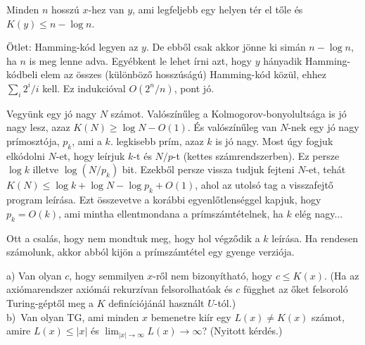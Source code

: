 \begin{Exercise}[counter={sorszam}, difficulty=0]
	Minden $n$ hosszú $x$-hez van $y$, ami legfeljebb egy helyen tér el t\H ole és $K(y)\leq n - \log n$.
\end{Exercise}	
\begin{Answer}
	\"Otlet: Hamming-k\'od legyen az $y$. De ebb\H ol csak akkor j\"onne ki sim\'an $n-\log n$, ha $n$ is meg lenne adva. Egy\'ebkent le lehet \'irni azt, hogy $y$ h\'anyadik Hamming-k\'odbeli elem az \"osszes (k\"ul\"onb\"oz\H o hossz\'us\'ag\'u) Hamming-k\'od k\"oz\"ul, ehhez $\sum_i 2^i/i$ kell. Ez indukci\'oval $O(2^n/n)$, pont j\'o.
\end{Answer}


\begin{Exercise}[counter={sorszam}, difficulty=0]
	Vegy\"unk egy j\'o nagy $N$ sz\'amot. Val\'osz\'in\H uleg a Kolmogorov-bonyolults\'aga is j\'o nagy lesz, azaz $K(N)\ge \log N - O(1)$. \'Es val\'osz\'in\H uleg van $N$-nek egy j\'o nagy pr\'imoszt\'oja, $p_k$, ami a $k.$ legkisebb pr\'im, azaz $k$ is j\'o nagy. Most \'ugy fogjuk elk\'odolni $N$-et, hogy le\'irjuk $k$-t \'es $N/p$-t (kettes sz\'amrendszerben). Ez persze $\log k$ illetve $\log (N/p_k)$ bit. Ezekb\H ol persze vissza tudjuk fejteni $N$-et, teh\'at $K(N)\le \log k + \log N - \log p_k +O(1)$, ahol az utols\'o tag a visszafejt\H o program le\'ir\'asa. Ezt \"osszevetve a kor\'abbi egyenl\H otlens\'eggel kapjuk, hogy $p_k=O(k)$, ami mintha ellentmondana a pr\'imsz\'amt\'etelnek, ha $k$ el\'eg nagy...
\end{Exercise}	
\begin{Answer}
	Ott a csal\'as, hogy nem mondtuk meg, hogy hol v\'egz\H odik a $k$ le\'ir\'asa. Ha rendesen sz\'amolunk, akkor abb\'ol kij\"on a pr\'imsz\'amt\'etel egy gyenge verzi\'oja.
\end{Answer}

\begin{Exercise}[counter={sorszam}, difficulty=0]
	a) Van olyan $c$, hogy semmilyen $x$-r\H ol nem bizony\'ithat\'o, hogy $c\le K(x)$. (Ha az axi\'omarendszer axi\'om\'ai rekurz\'ivan felsorolhat\'oak \'es $c$ f\"ugghet az \H oket felsorol\'o Turing-g\'ept\H ol meg a $K$ defin\'ici\'oj\'an\'al haszn\'alt $U$-t\'ol.)\\
	b)~\veryhard Van olyan TG, ami minden $x$ bemenetre kiír egy $L(x)\ne K(x)$ számot, amire $L(x)\le |x|$ \'es $\lim_{|x|\rightarrow\infty} L(x) \rightarrow\infty$? (Nyitott k\'erd\'es.)
\end{Exercise}	

